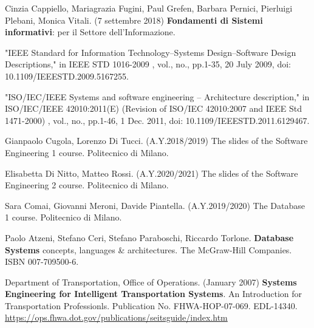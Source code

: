 \documentclass[a4paper,12pt]{report}
\begin{document}
\begin{thebibliography}{9}

Cinzia Cappiello, Mariagrazia Fugini, Paul Grefen, Barbara Pernici, Pierluigi Plebani, Monica Vitali. (7 settembre 2018)  \textbf{Fondamenti di Sistemi informativi}: per il Settore dell'Informazione.

"IEEE Standard for Information Technology--Systems Design--Software Design Descriptions," in IEEE STD 1016-2009 , vol., no., pp.1-35, 20 July 2009, doi: 10.1109/IEEESTD.2009.5167255.

"ISO/IEC/IEEE Systems and software engineering -- Architecture description," in ISO/IEC/IEEE 42010:2011(E) (Revision of ISO/IEC 42010:2007 and IEEE Std 1471-2000) , vol., no., pp.1-46, 1 Dec.
2011, doi: 10.1109/IEEESTD.2011.6129467.

Gianpaolo Cugola, Lorenzo Di Tucci. (A.Y.2018/2019) The slides of the Software Engineering 1 course.
Politecnico di Milano.

Elisabetta Di Nitto, Matteo Rossi. (A.Y.2020/2021) The slides of the Software Engineering 2 course.
Politecnico di Milano.

Sara Comai, Giovanni Meroni, Davide Piantella. (A.Y.2019/2020) The Database 1 course.
Politecnico di Milano.

Paolo Atzeni, Stefano Ceri, Stefano Paraboschi, Riccardo Torlone. \textbf{Database Systems} concepts, languages \& architectures.
The McGraw-Hill Companies.
ISBN 007-709500-6.
	
Department of Transportation, Office of Operations. (January 2007)
\textbf{Systems Engineering for Intelligent Transportation Systems}.
An Introduction for Transportation Professionls.
Publication No. FHWA-HOP-07-069.
EDL-14340.
\url{https://ops.fhwa.dot.gov/publications/seitsguide/index.htm}





\end{thebibliography}
\end{document}

